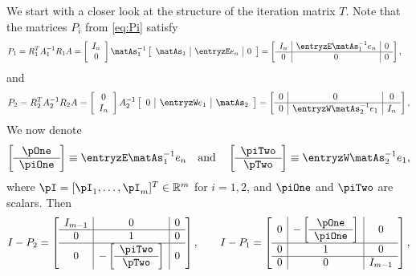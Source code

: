 We start with a closer look at the structure of the iteration matrix $T$.
Note that the matrices $P_i$ from \eqref{eq:Pi} satisfy
%
\begin{align*}
P_1 &= R_1^TA_1^{-1}R_1A
=\left[\begin{array}{c} I_{n}\\ 0\end{array}\right]\matAs_1^{-1}
\left[\begin{array}{c|c|c}\matAs_1 & \entryzE e_n & 0\end{array}\right]=
\left[\begin{array}{c|c|c}I_{n}&\entryzE \matAs_1^{-1}e_{n}&0\\\hline 0&0&0\end{array}\right],
\end{align*}
%
and
%
$$P_2 = R_2^TA_2^{-1}R_2A =
\left[\begin{array}{c} 0 \\  I_n\end{array}\right] A_2^{-1}
\left[\begin{array}{c|c|c}0 & \entryzW e_1 & \matAs_2 \end{array}\right]=
\left[\begin{array}{c|c|c}0&0&0\\\hline0&\entryzW \matAs_2^{-1}e_1&I_{n}\end{array}\right],$$
%
 We now denote
%
\begin{equation}\label{eq:1D:p_and_pi}
\left[\begin{array}{c}\pOne \\\hline \piOne\end{array}\right]
\equiv \entryzE\matAs_1^{-1}e_n\quad\mbox{and}\quad
\left[\begin{array}{c} \piTwo\\\hline \pTwo\end{array}\right]
\equiv \entryzW\matAs_2^{-1}e_1,
\end{equation}
%
where $\pI=[\pI_1,\dots,\pI_m]^T\in{\mathbb R}^m$ for $i=1,2$, and $\piOne$
and $\piTwo$ are scalars. Then
%
$$I - P_2  =
\left[\begin{array}{c|c|c}I_{m-1}&0&0\\\hline
0&1&0\\\hline 0&-\left[\begin{array}{c} \piTwo\\\hline \pTwo\end{array}\right]&0\end{array}\right],\qquad
I - P_1  =
\left[\begin{array}{c|c|c}0&-\left[\begin{array}{c}\pOne \\\hline \piOne\end{array}\right]&0\\\hline 0&1&0\\\hline 0&0&I_{m-1}\end{array}\right],$$

